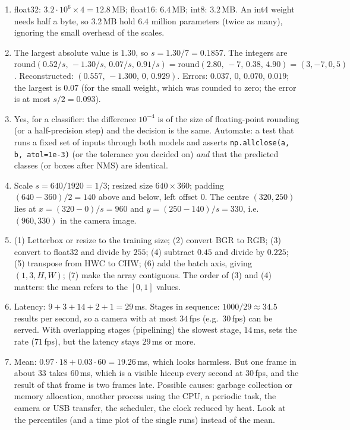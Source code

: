 \begin{enumerate}[label=\textbf{\ansnum.\arabic*}]
  \item float32: $3.2\cdot10^6\times4=12.8$\,MB; float16: $6.4$\,MB; int8: $3.2$\,MB. An int4 weight needs half a byte, so $3.2$\,MB hold $6.4$ million parameters (twice as many), ignoring the small overhead of the scales.
  \item The largest absolute value is $1.30$, so $s=1.30/7=0.1857$. The integers are $\mathrm{round}(0.52/s,\,-1.30/s,\,0.07/s,\,0.91/s)=\mathrm{round}(2.80,\,-7,\,0.38,\,4.90)=(3,-7,0,5)$. Reconstructed: $(0.557,\,-1.300,\,0,\,0.929)$. Errors: $0.037,\,0,\,0.070,\,0.019$; the largest is $0.07$ (for the small weight, which was rounded to zero; the error is at most $s/2=0.093$).
  \item Yes, for a classifier: the difference $10^{-4}$ is of the size of floating-point rounding (or a half-precision step) and the decision is the same. Automate: a test that runs a fixed set of inputs through both models and asserts \verb!np.allclose(a, b, atol=1e-3)! (or the tolerance you decided on) \emph{and} that the predicted classes (or boxes after NMS) are identical.
  \item Scale $s=640/1920=1/3$; resized size $640\times360$; padding $(640-360)/2=140$ above and below, left offset $0$. The centre $(320,250)$ lies at $x=(320-0)/s=960$ and $y=(250-140)/s=330$, i.e.\ $(960,330)$ in the camera image.
  \item (1) Letterbox or resize to the training size; (2) convert BGR to RGB; (3) convert to float32 and divide by $255$; (4) subtract $0.45$ and divide by $0.225$; (5) transpose from HWC to CHW; (6) add the batch axis, giving $(1,3,H,W)$; (7) make the array contiguous. The order of (3) and (4) matters: the mean refers to the $[0,1]$ values.
  \item Latency: $9+3+14+2+1=29$\,ms. Stages in sequence: $1000/29\approx34.5$ results per second, so a camera with at most $34$\,fps (e.g.\ $30$\,fps) can be served. With overlapping stages (pipelining) the slowest stage, $14$\,ms, sets the rate ($71$\,fps), but the latency stays $29$\,ms or more.
  \item Mean: $0.97\cdot18+0.03\cdot60=19.26$\,ms, which looks harmless. But one frame in about $33$ takes $60$\,ms, which is a visible hiccup every second at $30$\,fps, and the result of that frame is two frames late. Possible causes: garbage collection or memory allocation, another process using the CPU, a periodic task, the camera or USB transfer, the scheduler, the clock reduced by heat. Look at the percentiles (and a time plot of the single runs) instead of the mean.

\end{enumerate}

